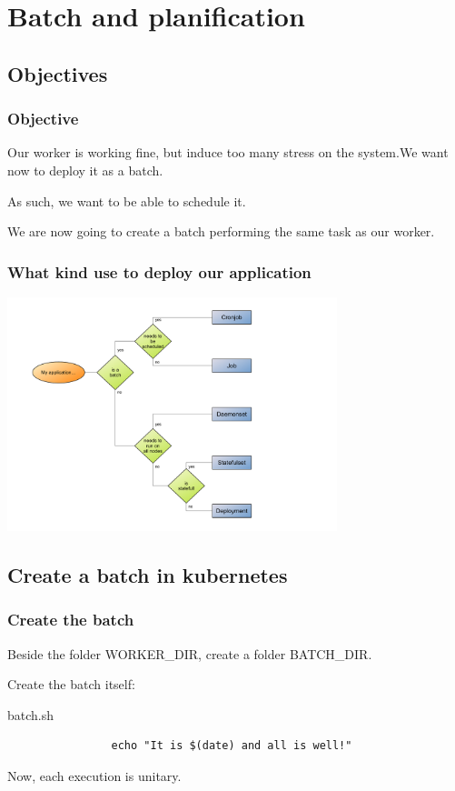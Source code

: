 \section{Batch and planification}

\subsection{Objectives}

	\begin{frame}
		\frametitle{Objective}
		
		Our worker is working fine, but induce too many stress on the system.We want now to deploy it as a batch.
		
		\bigskip
		As such, we want to be able to schedule it.
		
		\bigskip
		We are now going to create a batch performing the same task as our worker.
	\end{frame}

	\begin{frame}
		\frametitle{What kind use to deploy our application}
		
		\begin{center}
		\includegraphics[height=6.8cm]{../../../resources/color/choiceDeploymentType.pdf}
		\end{center}
	\end{frame}
		
\subsection{Create a batch in kubernetes}		
		
	\begin{frame}[fragile]
		\frametitle{Create the batch}
		
		Beside the folder WORKER\_DIR, create a folder BATCH\_DIR.
		
		\bigskip
		Create the batch itself:
		\begin{block}{batch.sh}
			\begin{verbatim}
				echo "It is $(date) and all is well!"
			\end{verbatim}
		\end{block}
		Now, each execution is unitary.
	\end{frame}
	
